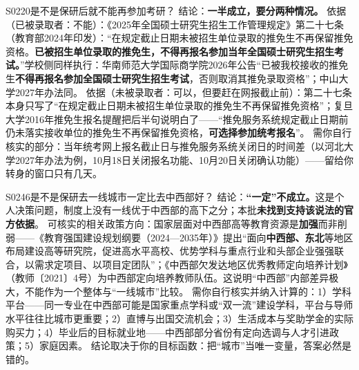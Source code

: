 \begin{qa}{S0220}{是不是保研后就不能再参加考研？}
结论：\textbf{一半成立，要分两种情况。}
依据（已被录取者：不能）：《2025年全国硕士研究生招生工作管理规定》第二十七条（教育部2024年印发）：“在规定截止日期未被招生单位录取的推免生不再保留推免资格。\textbf{已被招生单位录取的推免生，不得再报名参加当年全国硕士研究生招生考试。}”学校侧同样执行：华南师范大学国际商学院2026年公告“已被我校接收的推免生\textbf{不得再报名参加全国硕士研究生招生考试}，否则取消其推免录取资格”；中山大学2027年办法同。
依据（未被录取者：可以，但要赶在网报截止前）：第二十七条本身只写了“在规定截止日期未被招生单位录取的推免生不再保留推免资格”；复旦大学2016年推免生报名提醒把后半句说明白了——“推免服务系统规定截止日期前仍未落实接收单位的推免生不再保留推免资格，\textbf{可选择参加统考报名}”。
需你自行核实的部分：当年统考网上报名截止日与推免服务系统关闭日的时间差（以河北大学2027年办法为例，10月18日关闭报名功能、10月20日关闭确认功能）——留给你转身的窗口只有几天。
\end{qa}

\begin{qa}{S0246}{是不是保研去一线城市一定比去中西部好？}
结论：\textbf{“一定”不成立。}这是个人决策问题，制度上没有一线优于中西部的高下之分；本批\textbf{未找到支持该说法的官方依据}。
可核实的相关政策方向：国家层面对中西部高等教育资源是\textbf{加强}而非削弱——《教育强国建设规划纲要（2024—2035年）》提出“面向\textbf{中西部、东北}等地区布局建设高等研究院，促进高水平高校、优势学科与重点行业和头部企业强强联合，以需求定项目、以项目定团队”；《中西部欠发达地区优秀教师定向培养计划》（教师〔2021〕4号）为中西部定向培养教师队伍。这说明“中西部”内部差异极大，不能作为一个整体与“一线城市”比较。
需你自行核实并纳入计算的：1）学科平台——同一专业在中西部可能是国家重点学科或“双一流”建设学科，平台与导师水平往往比城市更重要；2）直博与出国交流机会；3）生活成本与奖助学金的实际购买力；4）毕业后的目标就业地——中西部部分省份有定向选调与人才引进政策；5）家庭因素。
结论取决于你的目标函数：把“城市”当唯一变量，答案必然是错的。
\end{qa}

